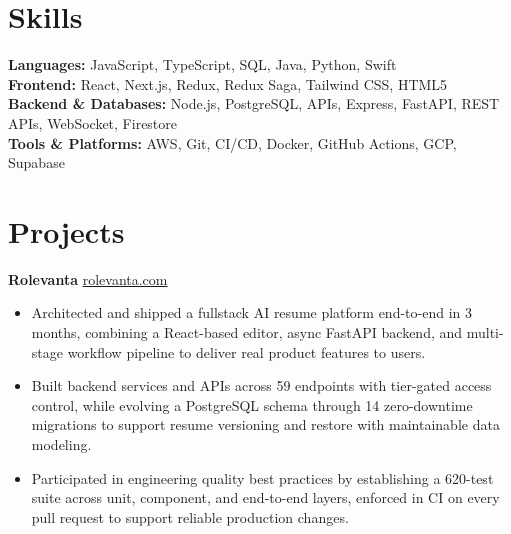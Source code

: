 \documentclass[11pt]{article}       %
\begin{document}
\vspace{-10.5pt}

\section*{Skills}
\textbf{Languages:} JavaScript, TypeScript, SQL, Java, Python, Swift \\
\textbf{Frontend:} React, Next.js, Redux, Redux Saga, Tailwind CSS, HTML5 \\
\textbf{Backend \& Databases:} Node.js, PostgreSQL, APIs, Express, FastAPI, REST APIs, WebSocket, Firestore \\
\textbf{Tools \& Platforms:} AWS, Git, CI/CD, Docker, GitHub Actions, GCP, Supabase
\vspace{-5pt}






\section*{Projects}
\textbf{Rolevanta} \hfill \href{https://rolevanta.com}{rolevanta.com} \\
\vspace{-9pt}
\begin{itemize}
  \item Architected and shipped a fullstack AI resume platform end-to-end in 3 months, combining a React-based editor, async FastAPI backend, and multi-stage workflow pipeline to deliver real product features to users.
  \item Built backend services and APIs across 59 endpoints with tier-gated access control, while evolving a PostgreSQL schema through 14 zero-downtime migrations to support resume versioning and restore with maintainable data modeling.
  \item Participated in engineering quality best practices by establishing a 620-test suite across unit, component, and end-to-end layers, enforced in CI on every pull request to support reliable production changes.
\end{itemize}
\end{document}
